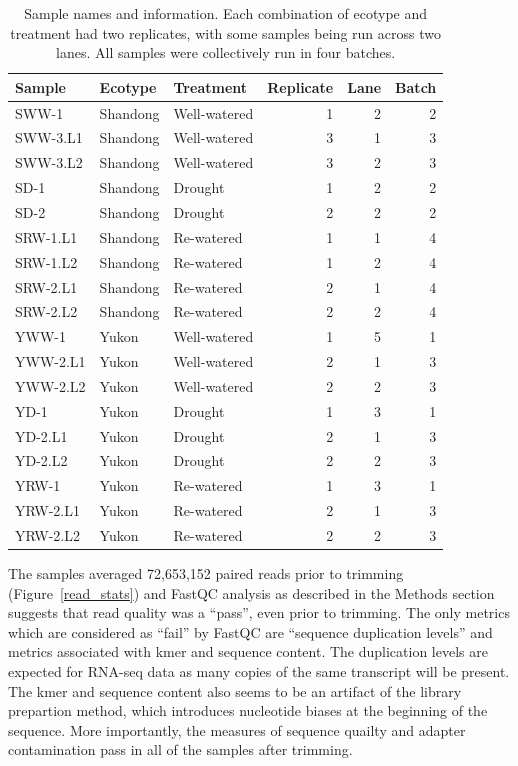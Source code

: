 \documentclass[12pt]{article}
\begin{document}
	\begin{table}[H]
		\centering
		\begin{tabular}{lllrrr}
			\toprule
			Sample & Ecotype & Treatment & Replicate & Lane & Batch\\
			\midrule
			\rowcolor{Gray}
			SWW-1 & Shandong & Well-watered & 1 & 2 & 2\\
			SWW-3.L1 & Shandong & Well-watered & 3 & 1 & 3\\
			SWW-3.L2 & Shandong & Well-watered & 3 & 2 & 3\\
			\rowcolor{Gray}
			SD-1 & Shandong & Drought & 1 & 2 & 2\\
			SD-2 & Shandong & Drought & 2 & 2 & 2\\
			\rowcolor{Gray}
			SRW-1.L1 & Shandong & Re-watered & 1 & 1 & 4\\
			\rowcolor{Gray}
			SRW-1.L2 & Shandong & Re-watered & 1 & 2 & 4\\
			SRW-2.L1 & Shandong & Re-watered & 2 & 1 & 4\\
			SRW-2.L2 & Shandong & Re-watered & 2 & 2 & 4\\
			\rowcolor{Gray}
			YWW-1 & Yukon & Well-watered & 1 & 5 & 1\\		
			YWW-2.L1 & Yukon & Well-watered & 2 & 1 & 3\\
			YWW-2.L2 & Yukon & Well-watered & 2 & 2 & 3\\
			\rowcolor{Gray}
			YD-1 & Yukon & Drought & 1 & 3 & 1\\
			YD-2.L1 & Yukon & Drought & 2 & 1 & 3\\
			YD-2.L2 & Yukon & Drought & 2 & 2 & 3\\
			\rowcolor{Gray}
			YRW-1 & Yukon & Re-watered & 1 & 3 & 1\\
			YRW-2.L1 & Yukon & Re-watered & 2 & 1 & 3\\
			YRW-2.L2 & Yukon & Re-watered & 2 & 2 & 3\\

	
			\bottomrule
		\end{tabular}
		\caption[Sample Names and Information]{Sample names and information. Each combination of ecotype and treatment had two replicates, with some samples being run across two lanes. All samples were collectively run in four batches.}
		\label{table:samples}
	\end{table}
	
	The samples averaged 72,653,152 paired reads prior to trimming (Figure~\ref{read_stats}) and FastQC analysis as described in the Methods section suggests that read quality was a ``pass'', even prior to trimming. The only metrics which are considered as ``fail'' by FastQC are ``sequence duplication levels'' and metrics associated with kmer and sequence content. The duplication levels are expected for RNA-seq data as many copies of the same transcript will be present. The kmer and sequence content also seems to be an artifact of the library prepartion method, which introduces nucleotide biases at the beginning of the sequence. More importantly, the  measures of sequence quailty and adapter contamination pass in all of the samples after trimming.
	
\end{document}
